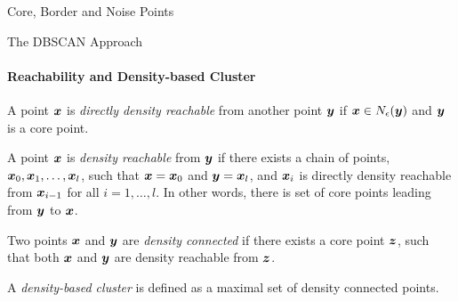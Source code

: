 \begin{frame}[fragile]{Core, Border and Noise Points}
\begin{figure}[!ht]%
  \centerline{
  \hspace{1in}
  }
\end{figure}
\end{frame}

\begin{frame}{The DBSCAN Approach}
\framesubtitle{Reachability and Density-based Cluster}

  A point ${\boldsymbol x}$ is {\em directly density reachable}
from another point ${\boldsymbol y}$ if ${\boldsymbol x} \in N_{\epsilon}({\boldsymbol y})$ and
${\boldsymbol y}$ is a core point. 

\medskip
A point ${\boldsymbol x}$ is {\em density
    reachable} from ${\boldsymbol y}$ if there exists a chain of points,
${\boldsymbol x}_0, {\boldsymbol x}_1, \ldots, {\boldsymbol x}_l$, such that
${\boldsymbol x} = {\boldsymbol x}_0$ and ${\boldsymbol y} = {\boldsymbol x}_l$, and
${\boldsymbol x}_i$ is
directly density reachable from ${\boldsymbol x}_{i-1}$ for all $i=1,\ldots,l$.
In other words,
there is set of core points leading from ${\boldsymbol y}$ to ${\boldsymbol x}$.

\medskip
Two points ${\boldsymbol x}$ and ${\boldsymbol y}$ are
{\em density connected}
if there exists a core point ${\boldsymbol z}$,
such that both ${\boldsymbol x}$ and ${\boldsymbol y}$ are density reachable from ${\boldsymbol z}$.

\medskip
A {\em density-based cluster} is def\/{i}ned as a maximal set of
density connected points.
\end{frame}


